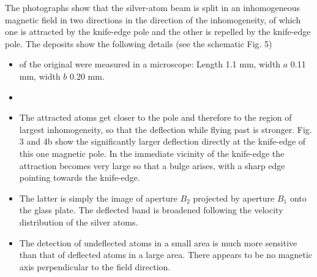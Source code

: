 \documentclass[11pt]{article}
\begin{document}
The photographs show that the silver-atom beam is split in an inhomogeneous magnetic field in two directions in the direction of the inhomogeneity, of which one is attracted by the knife-edge pole and the other is repelled by the knife-edge pole. The deposits show the following details (see the schematic Fig. 5)

\begin{itemize}
\item[a)]  of the original were measured in a microscope: Length 1.1 mm, width $a$ 0.11 mm, width $b$ 0.20 mm.
\item[b)] 
\item[c)]  The attracted atoms get closer to the pole and therefore to the region of largest inhomogeneity, so that the deflection while flying past is stronger. Fig. 3 and 4b show the significantly larger deflection directly at the knife-edge of this one magnetic pole. In the immediate vicinity of the knife-edge the attraction becomes very large so that a bulge arises, with a sharp edge pointing towards the knife-edge. 
\item[d)]  The latter is simply the image of aperture $B_2$ projected by aperture $B_1$ onto the glass plate. The deflected band is broadened following the velocity distribution of the silver atoms. 
\item[e)]  
The detection of undeflected atoms in a small area is much more sensitive than that of deflected atoms in a large area.  There appears to be no magnetic axis perpendicular to the field direction.
\end{itemize}

\end{document}
